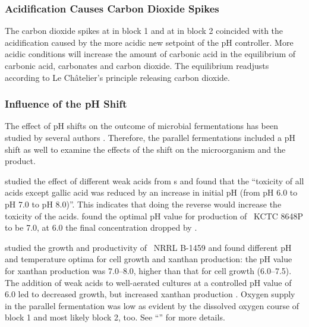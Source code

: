 \subsubsection{Acidification Causes Carbon Dioxide Spikes}
The carbon dioxide spikes at  in block 1 and at  in block 2 coincided with the acidification caused by the more acidic new setpoint of the pH controller. More acidic conditions will increase the amount of carbonic acid in the equilibrium of carbonic acid, carbonates and carbon dioxide. The equilibrium readjusts according to Le Châtelier's principle releasing carbon dioxide.

\subsubsection{Influence of the pH Shift\label{subsubsec-lch-eps-disc-lch-pf-ph-shift}}
The effect of pH shifts on the outcome of microbial \eps{} fermentations has been studied by several authors \cite{Degeest2002, Lee1999, Zaldivar1999b, Esgalhado1995, Esgalhado2002}. Therefore, the parallel fermentations included a pH shift as well to examine the effects of the shift on the microorganism and the product.

\textcite{Zaldivar1999b} studied the effect of different weak acids from \lch{}s and found that the \enquote{toxicity of all acids except gallic acid was reduced by an increase in initial pH (from pH 6.0 to pH 7.0 to pH 8.0)}. This indicates that doing the reverse would increase the toxicity of the acids. \textcite{Lee1999} found the optimal pH value for \eps{} production of ~KCTC 8648P to be \num{7.0}, at \num{6.0} the final \eps{} concentration dropped by .

\textcite{Esgalhado1995} studied the growth and productivity of ~NRRL B-1459 and found different pH and temperature optima for cell growth and xanthan production: the pH value for xanthan production was \numrange{7.0}{8.0}, higher than that for cell growth (\numrange{6.0}{7.5}). The addition of weak acids to well-aerated cultures at a controlled pH value of \num{6.0} led to decreased growth, but increased xanthan production \cite{Esgalhado2002}. Oxygen supply in the parallel fermentation was low as evident by the dissolved oxygen course of block 1 and most likely block 2, too. See \enquote{}  for more details.

